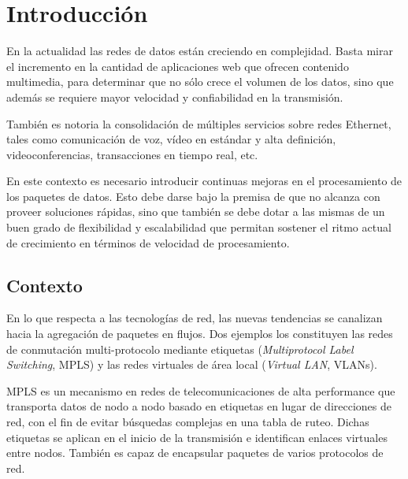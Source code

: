 \chapter{Introducción}

En la actualidad las redes de datos están creciendo en complejidad. Basta mirar el incremento en la cantidad de aplicaciones web que ofrecen contenido multimedia, para determinar que no sólo crece el volumen de los datos, sino que además se requiere mayor velocidad y confiabilidad en la transmisión. 

También es notoria la consolidación de múltiples servicios sobre redes \mbox{Ethernet,} tales como comunicación de voz, vídeo en estándar y alta definición, videoconferencias, transacciones en tiempo real, etc.

En este contexto es necesario introducir continuas mejoras en el procesamiento de los paquetes de datos. Esto debe darse bajo la premisa de que no alcanza con proveer soluciones rápidas, sino que también se debe dotar a las mismas de un buen grado de flexibilidad y escalabilidad que permitan sostener el ritmo actual de crecimiento en términos de velocidad de procesamiento.



\section{Contexto}


En lo que respecta a las tecnologías de red, las nuevas tendencias se canalizan hacia la agregación de paquetes en flujos. Dos ejemplos los constituyen las redes de conmutación multi-protocolo mediante etiquetas (\textit{Multiprotocol Label Switching}, MPLS) y las redes virtuales  de área local (\textit{Virtual LAN}, VLANs). 

MPLS es un mecanismo en redes de telecomunicaciones de alta performance que transporta datos de nodo a nodo basado en etiquetas en lugar de direcciones de red, con el fin de evitar búsquedas complejas en una tabla de ruteo. Dichas etiquetas se aplican en el inicio de la transmisión e identifican enlaces virtuales entre nodos. También es capaz de encapsular paquetes de varios protocolos de red.

